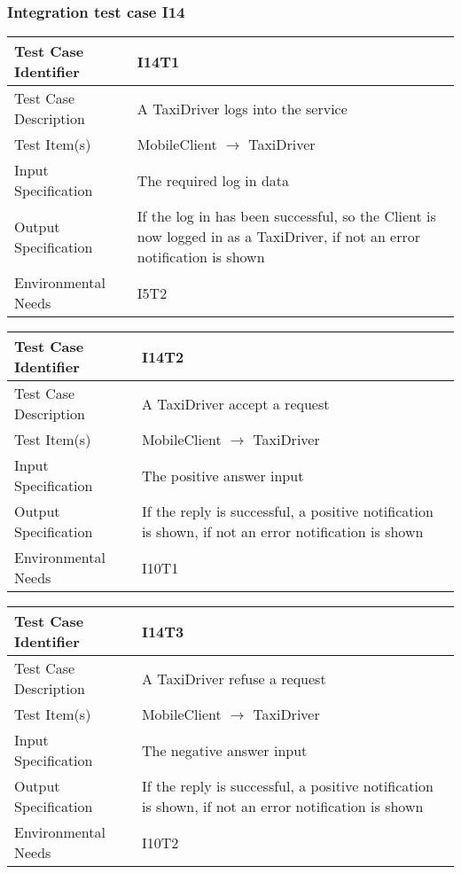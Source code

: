		\subsubsection{Integration test case I14}
		\begin{center}
			\begin{tabular}{ |l p{10cm}| } \hline
				Test Case Identifier & I14T1 \\ \hline
				Test Case Description & A TaxiDriver logs into the service \\ \hline
				Test Item(s) & MobileClient $\rightarrow$ TaxiDriver \\ \hline
				Input Specification & The required log in data  \\ \hline
				Output Specification & If the log in has been successful, so the Client is now logged in as a TaxiDriver, if not an
				error notification is shown \\ \hline
				Environmental Needs & I5T2 \\ \hline
			\end{tabular}
		\end{center}
		\vspace{1cm}
		\begin{center}
			\begin{tabular}{ |l p{10cm}| } \hline
				Test Case Identifier & I14T2 \\ \hline
				Test Case Description & A TaxiDriver accept a request \\ \hline
				Test Item(s) & MobileClient $\rightarrow$ TaxiDriver \\ \hline
				Input Specification & The positive answer input  \\ \hline
				Output Specification & If the reply is successful, a positive notification is shown, if not an error
				notification is shown\\ \hline
				Environmental Needs & I10T1 \\ \hline
			\end{tabular}
			\vspace{1cm}
			\begin{tabular}{ |l p{10cm}| } \hline
				Test Case Identifier & I14T3 \\ \hline
				Test Case Description & A TaxiDriver refuse a request \\ \hline
				Test Item(s) & MobileClient $\rightarrow$ TaxiDriver \\ \hline
				Input Specification & The negative answer input \\ \hline
				Output Specification & If the reply is successful, a positive notification is shown, if not an error
				notification is shown\\ \hline
				Environmental Needs & I10T2 \\ \hline
			\end{tabular}
		\end{center}
